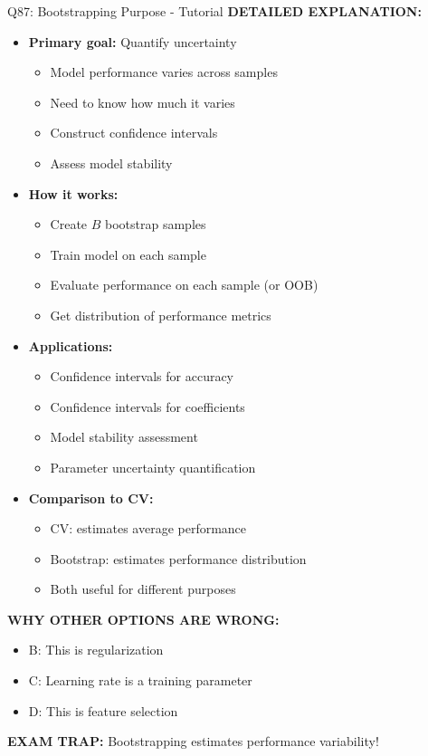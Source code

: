\documentclass[8pt]{beamer}
\begin{document}
\begin{frame}{Q87: Bootstrapping Purpose - Tutorial}
		\vspace{0.05cm}
		\textbf{DETAILED EXPLANATION:}
		\begin{itemize}
			\item \textbf{Primary goal:} Quantify uncertainty
			\begin{itemize}
				\item Model performance varies across samples
				\item Need to know how much it varies
				\item Construct confidence intervals
				\item Assess model stability
			\end{itemize}
			\item \textbf{How it works:}
			\begin{itemize}
				\item Create $B$ bootstrap samples
				\item Train model on each sample
				\item Evaluate performance on each sample (or OOB)
				\item Get distribution of performance metrics
			\end{itemize}
			\item \textbf{Applications:}
			\begin{itemize}
				\item Confidence intervals for accuracy
				\item Confidence intervals for coefficients
				\item Model stability assessment
				\item Parameter uncertainty quantification
			\end{itemize}
			\item \textbf{Comparison to CV:}
			\begin{itemize}
				\item CV: estimates average performance
				\item Bootstrap: estimates performance distribution
				\item Both useful for different purposes
			\end{itemize}
		\end{itemize}
		
		\vspace{0.05cm}
		\textcolor{myred}{\textbf{WHY OTHER OPTIONS ARE WRONG:}}
		\begin{itemize}
			\item \textcolor{myred}{B:} This is regularization
			\item \textcolor{myred}{C:} Learning rate is a training parameter
			\item \textcolor{myred}{D:} This is feature selection
		\end{itemize}
		
		\textcolor{myred}{\textbf{EXAM TRAP:}} Bootstrapping estimates performance variability!
	\end{frame}
	
\end{document}

